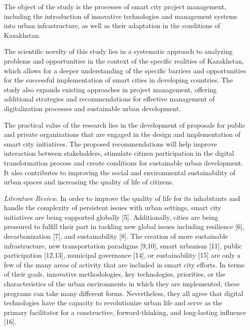 The object of the study is the processes of smart city project
management, including the introduction of innovative technologies and
management systems into urban infrastructure, as well as their
adaptation in the conditions of Kazakhstan.

The scientific novelty of this study lies in a systematic approach to
analyzing problems and opportunities in the context of the specific
realities of Kazakhstan, which allows for a deeper understanding of the
specific barriers and opportunities for the successful implementation of
smart cities in developing countries. The study also expands existing
approaches in project management, offering additional strategies and
recommendations for effective management of digitalization processes and
sustainable urban development.

The practical value of the research lies in the development of proposals
for public and private organizations that are engaged in the design and
implementation of smart city initiatives. The proposed recommendations
will help improve interaction between stakeholders, stimulate citizen
participation in the digital transformation process and create
conditions for sustainable urban development. It also contributes to
improving the social and environmental sustainability of urban spaces
and increasing the quality of life of citizens.

\emph{Literature Review.} In order to improve the quality of life for
its inhabitants and handle the complexity of persistent issues with
urban settings, smart city initiatives are being supported globally
{[}5{]}. Additionally, cities are being pressured to fulfill their part
in tackling new global issues including resilience {[}6{]},
decarbonization {[}7{]}, and sustainability {[}8{]}. The creation of
more sustainable infrastructure, new transportation paradigms
{[}9,10{]}, smart urbanism {[}11{]}, public participation {[}12,13{]},
municipal governance {[}14{]}, or sustainability {[}15{]} are only a few
of the many areas of activity that are included in smart city efforts.
In terms of their goals, innovative methodologies, key technologies,
priorities, or the characteristics of the urban environments in which
they are implemented, these programs can take many different forms.
Nevertheless, they all agree that digital technologies have the capacity
to revolutionize urban life and serve as the primary facilitator for a
constructive, forward-thinking, and long-lasting influence {[}16{]}.

